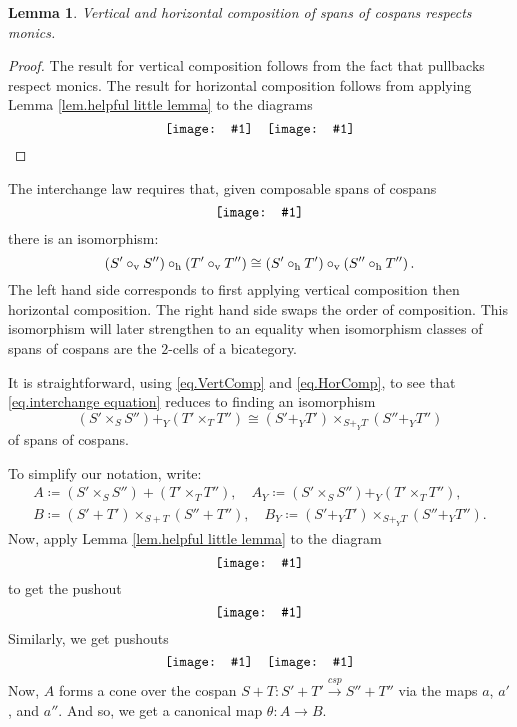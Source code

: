 \documentclass[11pt]{amsart}
\renewcommand{\t}[1]{\textup{#1}}
\newcommand{\from}{\colon}
\newcommand{\cospan}{\xrightarrow{\mathit{csp}}}
\newcommand{\diagram}[1]{\raisebox{-0.5\height}{\texttt{[image: \#1]}}}
\newtheorem{lem}[thm]{Lemma}
\theoremstyle{remark}
\theoremstyle{definition}
\begin{document}
\begin{lem}
	Vertical and horizontal composition of 
	spans of cospans respects monics.
\end{lem}
\begin{proof}
	The result for vertical composition 
	follows from the fact that pullbacks 
	respect monics. The result for horizontal 
	composition follows from applying Lemma 
	\ref{lem.helpful little lemma} to the 
	diagrams
	\[
	\diagram{NoRef_CompRespectMonics1}
	\quad
	\diagram{NoRef_CompRespectMonics2}
	\qedhere
	\]
\end{proof}

The interchange law requires that, given composable spans of cospans
\begin{equation}
	\label{diag.2cells interchanged}
	\diagram{Diag_2CellsInterchanged}
\end{equation}
%
there is an isomorphism:
%
\begin{equation} 
\label{eq.interchange equation}
\left( S' \circ_\t{v} S'' \right) \circ_\t{h} 
\left( T' \circ_\t{v} T'' \right) \cong
\left( S' \circ_\t{h} T' \right) \circ_\t{v} 
\left( S'' \circ_\t{h} T'' \right).
\end{equation}
%
The left hand side corresponds to first applying vertical composition then horizontal composition.  The right hand side swaps the order of composition. This isomorphism will later strengthen to an equality when isomorphism classes of spans of cospans are the $2$-cells of a bicategory.

It is straightforward, using \eqref{eq.VertComp} and \eqref{eq.HorComp}, to see that \eqref{eq.interchange equation} reduces to finding an isomorphism
%
\begin{equation}
\label{eq.interchange simplified}
	(S' \times_S S'') +_Y (T' \times_T T'')
	\cong
	(S' +_Y T') \times_{S+_YT} (S'' +_Y T'')
\end{equation}
of spans of cospans.

%
%
%
%
%

To simplify our notation, write:
%
\begin{gather*}
A \coloneqq (S' \times_SS'') + (T' \times_TT''), \quad 
A_Y \coloneqq (S' \times_SS'') +_Y (T' \times_TT''),\\
B \coloneqq (S'+T') \times_{S+T} (S''+T''),  \quad  
B_Y \coloneqq (S'+_YT') \times_{S+_YT} (S''+_YT''). 
\end{gather*}
Now, apply Lemma \ref{lem.helpful little lemma} to the diagram
\[
	\label{NoRef_GettingAMaps}
	\diagram{NoRef_GettingAMaps}
\]
to get the pushout
\[
	\label{NoRef_AMaps}
	\diagram{NoRef_AMaps}
\]
Similarly, we get pushouts
\[
	\diagram{NoRef_APrimeMaps}
	\quad
	\diagram{NoRef_APrimePrimeMaps}
\]
Now, $A$  forms a cone over the cospan $S+T \from S'+T' \cospan S'' + T''$ via the maps $a$, $a'$, and $a''$. And so, we get a canonical map $\theta \from A \to B$.  
%
%
%
%
%
%
\end{document}
